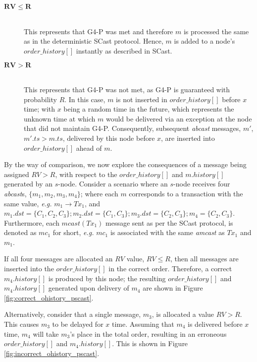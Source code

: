     \begin{description}
        \item[$\bm{RV \leq R}$]\hfill \\
        This represents that G4-P was met and therefore $m$ is processed the same as in the deterministic \textsf{SCast} protocol.  Hence, $m$ is added to a node's $order\_history[]$ instantly as described in \textsf{SCast}.  
        
        \item[$\bm{RV > R}$]\hfill \\
        This represents that G4-P was not met, as G4-P is guaranteed with probability $R$.  In this case, $m$ is not inserted in $order\_history[]$ before $x$ time; with $x$ being a random time in the future, which represents the unknown time at which $m$ would be delivered via an exception at the node that did not maintain G4-P.  Consequently, subsequent \emph{abcast} messages, $m'$, $m'.ts > m.ts$, delivered by this node before $x$, are inserted into $order\_history[]$ ahead of $m$.  
    \end{description}
    
    By the way of comparison, we now explore the consequences of a message being assigned $RV > R$, with respect to the $order\_history[]$ and $m.history[]$ generated by an $s$-node.  Consider a scenario where an $s$-node receives four \emph{abcast}s, $\{m_1, m_2, m_3, m_4\}$; where each $m$ corresponds to a transaction with the same value, \emph{e.g.} $m_1 \rightarrow Tx_1$, and $m_1.dst = \{C_1, C_2, C_3\}; m_2.dst = \{C_1, C_3\}; m_3.dst = \{C_2, C_3\}; m_4 = \{C_2, C_3\}$.  Furthermore, each $mcast(Tx_1)$ message sent as per the \textsf{SCast} protocol, is denoted as $mc_1$ for short, \emph{e.g.} $mc_1$ is associated with the same \emph{amcast} as $Tx_1$ and $m_1$.  
    
    If all four messages are allocated an $RV$ value, $RV \leq R$, then all messages are inserted into the $order\_history[]$ in the correct order.  Therefore, a correct $m_4.history[]$ is produced by this node; the resulting $order\_history[]$ and $m_4.history[]$ generated upon delivery of $m_4$ are shown in Figure \ref{fig:correct_ohistory_pscast}.  
    
    Alternatively, consider that a single message, $m_3$, is allocated a value $RV > R$.  This causes $m_3$ to be delayed for $x$ time.  Assuming that $m_4$ is delivered before $x$ time, $m_4$ will take $m_3$'s place in the total order, resulting in an erroneous $order\_history[]$ and $m_4.history[]$.  This is shown in Figure \ref{fig:incorrect_ohistory_pscast}.  
    
